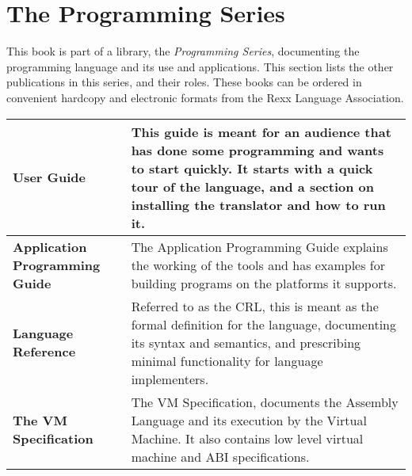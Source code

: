 \chapter{The \crexx{} Programming Series}
This book is part of a library, the \emph{\crexx{} Programming Series}, documenting the \crexx{} programming language and its use and applications. This section lists the other publications in this series, and their roles. These books can be ordered in convenient hardcopy and electronic formats from the Rexx Language Association.
\newline
\newline
\begin{tabularx}{\textwidth}{>{\bfseries}lX}
\toprule
User Guide & This guide is meant for an audience that has done some programming and wants to start quickly. It starts with a quick tour of the language, and a section on installing the \crexx{} translator and how to run it.
\\\midrule
Application Programming Guide & The Application Programming Guide
explains the working of the tools and has examples for building
programs on the platforms it supports.
\\\midrule
Language Reference & Referred to as the CRL, this is meant as the formal definition for the language, documenting its syntax and semantics, and prescribing minimal functionality for language implementers.
\\\midrule
The \crexx{} VM Specification & The \crexx{} VM
Specification, documents the \crexx{} Assembly Language and its execution
by the \crexx{} Virtual Machine. It also contains low level virtual
machine and ABI specifications.
\\\bottomrule
\end{tabularx}

